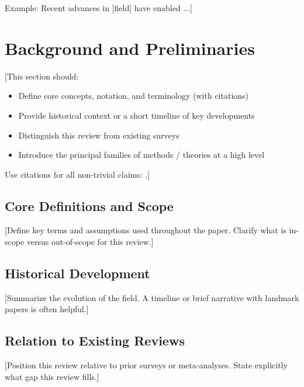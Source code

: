 \documentclass[conference]{IEEEtran}
\begin{document}
Example: Recent advances in [field] have enabled \cite{author2023survey}...]

\section{Background and Preliminaries}
[This section should:
\begin{itemize}
    \item Define core concepts, notation, and terminology (with citations)
    \item Provide historical context or a short timeline of key developments
    \item Distinguish this review from existing surveys \cite{smithmeta2022}
    \item Introduce the principal families of methods / theories at a high level
\end{itemize}

Use citations for all non-trivial claims: \cite{jones2024study}.]

\subsection{Core Definitions and Scope}
[Define key terms and assumptions used throughout the paper. Clarify what is
in-scope versus out-of-scope for this review.]

\subsection{Historical Development}
[Summarize the evolution of the field. A timeline or brief narrative with
landmark papers is often helpful.]

\subsection{Relation to Existing Reviews}
[Position this review relative to prior surveys or meta-analyses. State
explicitly what gap this review fills.]

\end{document}
